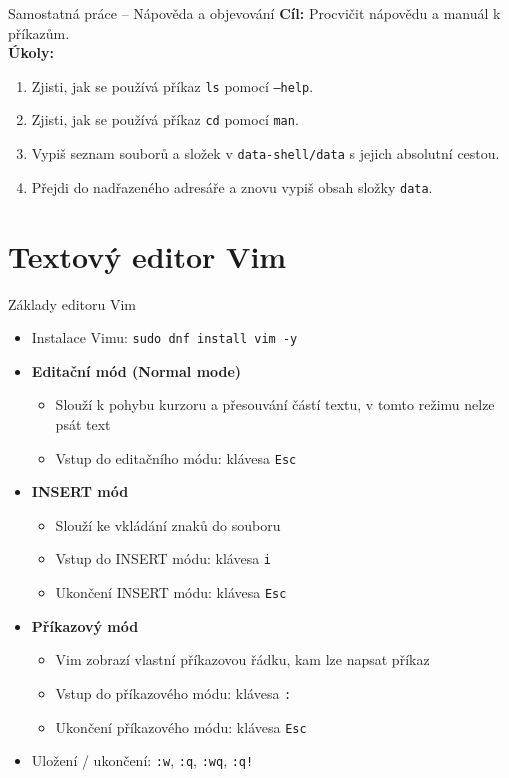 \documentclass{beamer}
\begin{document}
\begin{frame}{Samostatná práce – Nápověda a objevování}
\small
\textbf{Cíl:} Procvičit nápovědu a manuál k příkazům.\\[0.5em]

\textbf{Úkoly:}
\begin{enumerate}
  \item Zjisti, jak se používá příkaz \texttt{ls} pomocí \texttt{--help}.
  \item Zjisti, jak se používá příkaz \texttt{cd} pomocí \texttt{man}.
  \item Vypiš seznam souborů a složek v \texttt{data-shell/data} s jejich absolutní cestou.
  \item Přejdi do nadřazeného adresáře a znovu vypiš obsah složky \texttt{data}.
\end{enumerate}
\end{frame}


\section{Textový editor Vim}
\begin{frame}{Základy editoru Vim}
  \begin{itemize}
    \item Instalace Vimu: \texttt{sudo dnf install vim -y}

    \item \textbf{Editační mód (Normal mode)}
      \begin{itemize}
        \item Slouží k pohybu kurzoru a přesouvání částí textu, v tomto režimu
        nelze psát text
        \item Vstup do editačního módu: klávesa \texttt{Esc}
      \end{itemize}
            \vspace{0.5em}
    \item \textbf{INSERT mód}
      \begin{itemize}
        \item Slouží ke vkládání znaků do souboru
        \item Vstup do INSERT módu: klávesa \texttt{i}
        \item Ukončení INSERT módu: klávesa \texttt{Esc}
      \end{itemize}
            \vspace{0.5em}
    \item \textbf{Příkazový mód}
      \begin{itemize}
        \item Vim zobrazí vlastní příkazovou řádku, kam lze napsat příkaz
        \item Vstup do příkazového módu: klávesa \texttt{:}
        \item Ukončení příkazového módu: klávesa \texttt{Esc}
      \end{itemize}
            \vspace{0.5em}
    \item Uložení / ukončení: \texttt{:w}, \texttt{:q}, \texttt{:wq}, \texttt{:q!}
  \end{itemize}
\end{frame}
\end{document}
